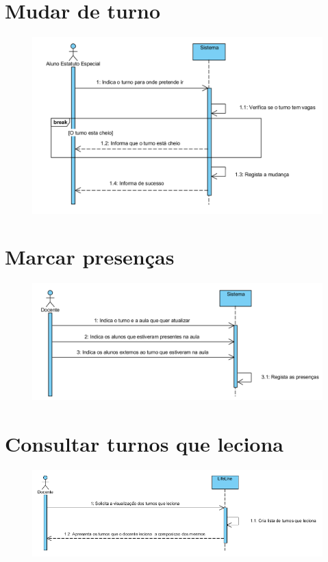 \documentclass[12pt,a4paper]{report}
\begin{document}
\begin{appendices}
\section{Mudar de turno}
\begin{figure}[H]
	\centering 
	\includegraphics[width=\textwidth]{modelacao/use_case_diagram/MudarTurno.png}  
\end{figure}

\section{Marcar presenças}
\begin{figure}[H]
	\centering 
	\includegraphics[width=\textwidth]{modelacao/use_case_diagram/MarcarPresencas.png}  
\end{figure}

\section{Consultar turnos que leciona}
\begin{figure}[H]
	\centering 
	\includegraphics[width=\textwidth]{modelacao/use_case_diagram/ConsultarTurnosLeciona.png}  
\end{figure}


\end{appendices}
\end{document}
